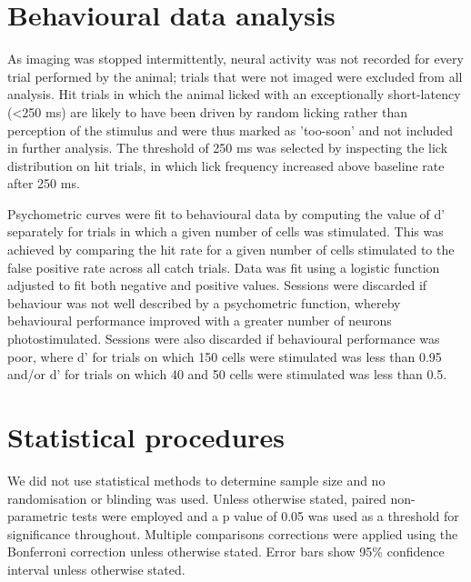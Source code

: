 \section{Behavioural data analysis}

As imaging was stopped intermittently, neural activity was not recorded for every trial performed by the animal; trials that were not imaged were excluded from all analysis. Hit trials in which the animal licked with an exceptionally short-latency (<250 ms) are likely to have been driven by random licking rather than perception of the stimulus and were thus marked as 'too-soon' and not included in further analysis. The threshold of 250 ms was selected by inspecting the lick distribution on hit trials, in which lick frequency increased above baseline rate after 250 ms. 

Psychometric curves were fit to behavioural data by computing the value of d’ separately for trials in which a given number of cells was stimulated. This was achieved by comparing the hit rate for a given number of cells stimulated to the false positive rate across all catch trials. Data was fit using a logistic function adjusted to fit both negative and positive values. Sessions were discarded if behaviour was not well described by a psychometric function, whereby behavioural performance improved with a greater number of neurons photostimulated. Sessions were also discarded if behavioural performance was poor, where d' for trials on which 150 cells were stimulated was less than 0.95 and/or d' for trials on which 40 and 50 cells were stimulated was less than 0.5.

\section{Statistical procedures}
We did not use statistical methods to determine sample size and no randomisation or blinding was used. Unless otherwise stated, paired non-parametric tests were employed and a p value of 0.05 was used as a threshold for significance throughout. Multiple comparisons corrections were applied using the Bonferroni correction unless otherwise stated. Error bars show 95\% confidence interval unless otherwise stated.


